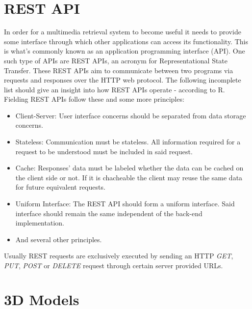 \section{REST API}
\label{sec:rest_api_concept}

In order for a multimedia retrieval system to become useful it needs to provide some interface through which other applications can access its functionality. This is what's commonly known as an application programming interface (API). One such type of APIs are REST APIs, an acronym for Representational State Transfer. These REST APIs aim to communicate between two programs via requests and responses over the HTTP web protocol. The following incomplete list should give an insight into how REST APIs operate - according to R. Fielding \cite{rest_api:2000} REST APIs follow these and some more principles:
\begin{itemize}
	\item Client-Server: User interface concerns should be separated from data storage concerns.
	\item Stateless: Communication must be stateless. All information required for a request to be understood must be included in said request.
	\item Cache: Responses' data must be labeled whether the data can be cached on the client side or not. If it is chacheable the client may reuse the same data for future equivalent requests.
	\item Uniform Interface: The REST API should form a uniform interface. Said interface should remain the same independent of the back-end implementation.
	\item And several other principles.
\end{itemize}
Usually REST requests are exclusively executed by sending an HTTP \textit{GET}, \textit{PUT}, \textit{POST} or \textit{DELETE} request through certain server provided URLs.\\

\section{3D Models}
\label{sec:3D_models}

